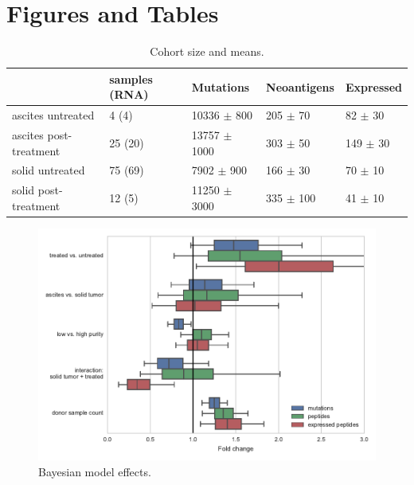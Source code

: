 \section*{Figures and Tables}

\begin{table}

\begin{tabular}{lllll}
\toprule
{} & samples (RNA) &         Mutations &    Neoantigens &     Expressed \\
\midrule
ascites untreated      &         4 (4) &   10336 $\pm$ 800 &   205 $\pm$ 70 &   82 $\pm$ 30 \\
ascites post-treatment &       25 (20) &  13757 $\pm$ 1000 &   303 $\pm$ 50 &  149 $\pm$ 30 \\
solid untreated        &       75 (69) &    7902 $\pm$ 900 &   166 $\pm$ 30 &   70 $\pm$ 10 \\
solid post-treatment   &        12 (5) &  11250 $\pm$ 3000 &  335 $\pm$ 100 &   41 $\pm$ 10 \\
\bottomrule
\end{tabular}


\caption{Cohort size and means.}
\label{tab:cohort}
\end{table}

\begin{figure}
\centering
\includegraphics[scale=1.0]{figures/bayesian_model_effects.pdf}
\caption{Bayesian model effects. }
\label{fig:bayesian}
\end{figure}

